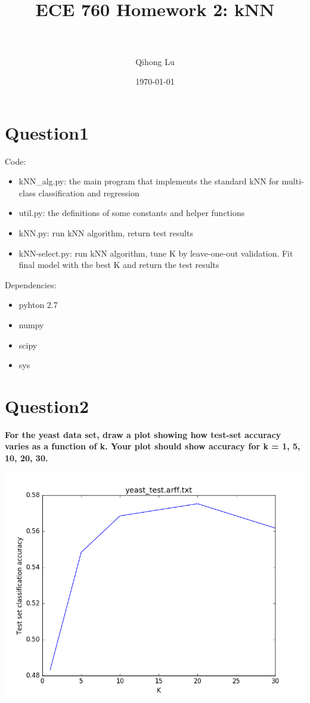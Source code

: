 \documentclass[paper=a4, fontsize=11pt]{scrartcl} %
\title{	
\normalfont \normalsize 
\horrule{0.5pt} \\[0.4cm] %
\huge ECE 760 Homework 2: kNN\\ %
\horrule{2pt} \\[0.5cm] %
}
\author{Qihong Lu} %
\date{\normalsize\today} %
\numberwithin{equation}{section} %
\numberwithin{figure}{section} %
\numberwithin{table}{section} %
\begin{document}
\maketitle %

\section*{Question1}
Code: 
\begin{itemize}
	\item kNN\_alg.py: the main program that implements the standard kNN for multi-class classification and regression 
	\item util.py: the definitions of some constants and helper functions 
	\item kNN.py: run kNN algorithm, return test results
	\item kNN-select.py: run kNN algorithm, tune K by leave-one-out validation. Fit final model with the best K and return the test results 
\end{itemize}
 
\hfill 

Dependencies: 
\begin{itemize}
  \item pyhton 2.7 
  \item numpy 
  \item scipy 
  \item sys
\end{itemize}



\newpage
\section*{Question2}

\textbf{For the yeast data set, draw a plot showing how test-set accuracy varies as a function of k. Your plot should show accuracy for k = 1, 5, 10, 20, 30.}
\begin{center}
\includegraphics[scale=.55]{pics/hw2_2_1.png}
\end{center}
\end{document}
